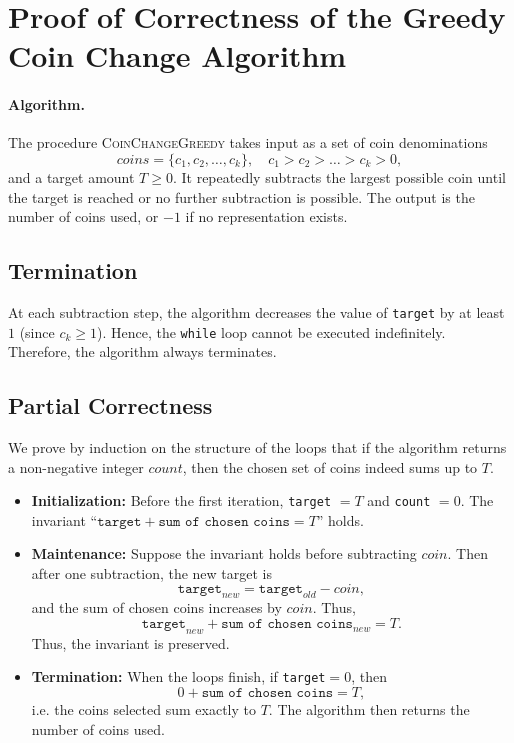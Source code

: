 \documentclass[12pt,a4paper]{report}
\begin{document}
\section{Proof of Correctness of the Greedy Coin Change Algorithm}

\paragraph{Algorithm.}
The procedure \textsc{CoinChangeGreedy} takes input as a set of coin denominations 
\[
coins = \{c_1, c_2, \dots, c_k\}, \quad c_1 > c_2 > \dots > c_k > 0,
\]
and a target amount $T \geq 0$. It repeatedly subtracts the largest possible coin until the target is reached or no further subtraction is possible. The output is the number of coins used, or $-1$ if no representation exists.

\subsection*{Termination}
At each subtraction step, the algorithm decreases the value of \texttt{target} by at least $1$ (since $c_k \geq 1$). Hence, the \texttt{while} loop cannot be executed indefinitely.  
Therefore, the algorithm always terminates.

\subsection*{Partial Correctness}
We prove by induction on the structure of the loops that if the algorithm returns a non-negative integer $count$, then the chosen set of coins indeed sums up to $T$.

\begin{itemize}
    \item \textbf{Initialization:} Before the first iteration, \texttt{target} $=T$ and \texttt{count} $=0$. The invariant ``$\texttt{target} + \texttt{sum of chosen coins} = T$'' holds.
    \item \textbf{Maintenance:} Suppose the invariant holds before subtracting $coin$. Then after one subtraction, the new target is
    \[
    \texttt{target}_{new} = \texttt{target}_{old} - coin,
    \]
    and the sum of chosen coins increases by $coin$. Thus,
    \[
    \texttt{target}_{new} + \texttt{sum of chosen coins}_{new} = T.
    \]
    Thus, the invariant is preserved.
    \item \textbf{Termination:} When the loops finish, if \texttt{target}$=0$, then
    \[
    0 + \texttt{sum of chosen coins} = T,
    \]
    i.e. the coins selected sum exactly to $T$. The algorithm then returns the number of coins used.
\end{itemize}
\end{document}

